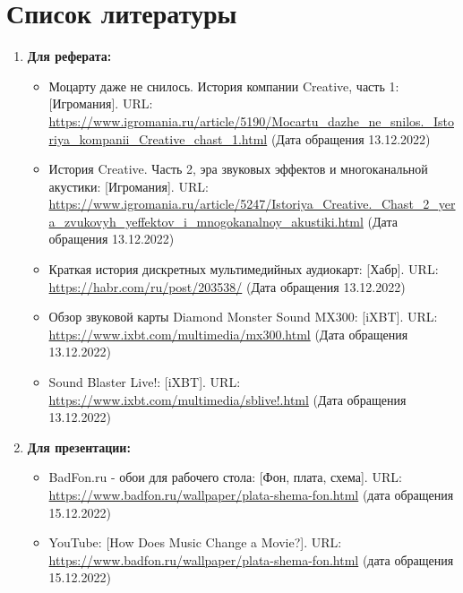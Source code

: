 \documentclass[a4paper,12pt]{extarticle}
\begin{document}
    \section{Список литературы}
    \begin{enumerate}[label=\textbf{\arabic*}]
        \item \textbf{Для реферата:}
        \begin{itemize}
            \item Моцарту даже не снилось. История компании Creative, часть 1: [Игромания]. URL: \url{https://www.igromania.ru/article/5190/Mocartu_dazhe_ne_snilos._Istoriya_kompanii_Creative_chast_1.html} (Дата обращения 13.12.2022)
            \item История Creative. Часть 2, эра звуковых эффектов и многоканальной акустики: [Игромания]. URL: \url{https://www.igromania.ru/article/5247/Istoriya_Creative._Chast_2_yera_zvukovyh_yeffektov_i_mnogokanalnoy_akustiki.html} (Дата обращения 13.12.2022)
            \item Краткая история дискретных мультимедийных аудиокарт: [Хабр]. URL: \url{https://habr.com/ru/post/203538/} (Дата обращения 13.12.2022)
            \item Обзор звуковой карты Diamond Monster Sound MX300: [iXBT]. URL: \url{https://www.ixbt.com/multimedia/mx300.html} (Дата обращения 13.12.2022)
            \item Sound Blaster Live!: [iXBT]. URL: \url{https://www.ixbt.com/multimedia/sblive!.html} (Дата обращения 13.12.2022)
        \end{itemize}
        \item \textbf{Для презентации:}
        \begin{itemize}
            \item BadFon.ru - обои для рабочего стола: [Фон, плата, схема]. URL: \url{https://www.badfon.ru/wallpaper/plata-shema-fon.html} (дата обращения 15.12.2022)

            \item YouTube: [How Does Music Change a Movie?]. URL: \url{https://www.badfon.ru/wallpaper/plata-shema-fon.html} (дата обращения 15.12.2022)


\end{itemize}
\end{enumerate}
\end{document}
